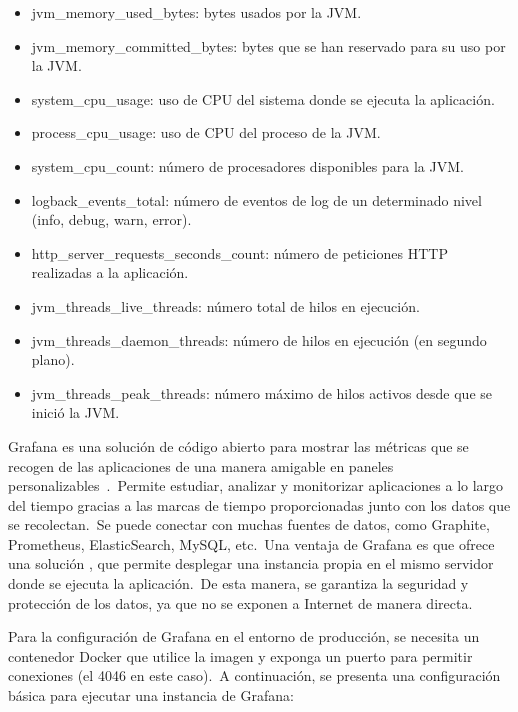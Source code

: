 \begin{itemize}
	\item jvm\_memory\_used\_bytes: bytes usados por la JVM\@.
	\item jvm\_memory\_committed\_bytes: bytes que se han reservado para su uso por la JVM\@.
	\item system\_cpu\_usage: uso de CPU del sistema donde se ejecuta la aplicación.
	\item process\_cpu\_usage: uso de CPU del proceso de la JVM\@.
	\item system\_cpu\_count: número de procesadores disponibles para la JVM\@.
	\item logback\_events\_total: número de eventos de log de un determinado nivel (info, debug, warn, error).
	\item http\_server\_requests\_seconds\_count: número de peticiones HTTP realizadas a la aplicación.
	\item jvm\_threads\_live\_threads: número total de hilos en ejecución.
	\item jvm\_threads\_daemon\_threads: número de hilos en ejecución (en segundo plano).
	\item jvm\_threads\_peak\_threads: número máximo de hilos activos desde que se inició la JVM\@.
\end{itemize}
\label{itm:most-used-metrics}

Grafana es una solución de código abierto para mostrar las métricas que se recogen de las aplicaciones de una
manera amigable en paneles personalizables~\cite{what-is-grafana}.\ Permite estudiar, analizar y monitorizar
aplicaciones a lo largo del tiempo gracias a las marcas de tiempo proporcionadas junto con los datos que se
recolectan.\ Se puede conectar con muchas fuentes de datos, como Graphite, Prometheus, ElasticSearch, MySQL, etc.\
Una ventaja de Grafana es que ofrece una solución , que permite desplegar una instancia propia en
el mismo servidor donde se ejecuta la aplicación.\ De esta manera, se garantiza la seguridad y protección de los
datos, ya que no se exponen a Internet de manera directa.

Para la configuración de Grafana en el entorno de producción, se necesita un contenedor Docker que utilice la imagen
\monoFont{grafana/grafana-oss} y exponga un puerto para permitir conexiones (el 4046 en este caso).\ A continuación,
se presenta una configuración básica para ejecutar una instancia de Grafana:

